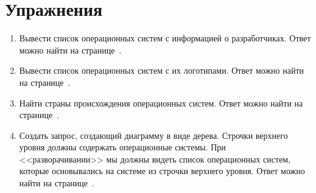 \section{Упражнения}
\label{tasks:operating_system_tasks}
\begin{enumerate}
	\item Вывести список операционных систем с информацией о разработчиках. Ответ можно найти на странице~\pageref{answer:os_and_developers}.
	\item Вывести список операционных систем с их логотипами. Ответ можно найти на странице~\pageref{answer:os_and_logos}.
	\item Найти страны происхождения операционных систем. Ответ можно найти на странице~\pageref{answer:os_country}.
	\item Создать запрос, создающий диаграмму в виде дерева. Строчки верхнего уровня должны содержать операционные системы. При <<разворачивании>> мы должны видеть список операционных систем, которые основывались на системе из строчки верхнего уровня. Ответ можно найти на странице~\pageref{answer:os_and_bases}.
\end{enumerate}
